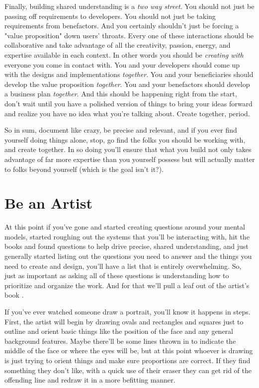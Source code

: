 \documentclass[11pt,a5paper]{book}
\begin{document}
Finally, building shared understanding is a \textit{two way street}. You should not just be passing off requirements to developers. You should not just be taking requirements from benefactors. And you certainly shouldn't just be forcing a "value proposition" down users' throats. Every one of these interactions should be collaborative and take advantage of all the creativity, passion, energy, and expertise available in each context. In other words you should be \textit{creating with} everyone you come in contact with. You and your developers should come up with the designs and implementations \textit{together}. You and your beneficiaries should develop the value proposition \textit{together}. You and your benefactors should develop a business plan \textit{together}. And this should be happening right from the start, don't wait until you have a polished version of things to bring your ideas forward and realize you have no idea what you're talking about. Create together, period.
\newline

So in sum, document like crazy, be precise and relevant, and if you ever find yourself doing things alone, stop, go find the folks you should be working with, and create together. In so doing you'll ensure that what you build not only takes advantage of far more expertise than you yourself possess but will actually matter to folks beyond yourself (which is the goal isn't it?).

\section{Be an Artist}
At this point if you've gone and started creating questions around your mental models, started roughing out the systems that you'll be interacting with, hit the books and found questions to help drive precise, shared understanding, and just generally started listing out the questions you need to answer and the things you need to create and design, you'll have a list that is entirely overwhelming. So, just as important as asking all of these questions is understanding how to prioritize and organize the work. And for that we'll pull a leaf out of the artist's book \cite{patton}.
\newline

If you've ever watched someone draw a portrait, you'll know it happens in steps. First, the artist will begin by drawing ovals and rectangles and squares just to outline and orient basic things like the position of the face and any general background features. Maybe there'll be some lines thrown in to indicate the middle of the face or where the eyes will be, but at this point whoever is drawing is just trying to orient things and make sure proportions are correct. If they find something they don't like, with a quick use of their eraser they can get rid of the offending line and redraw it in a more befitting manner. 
\newline
\end{document}
